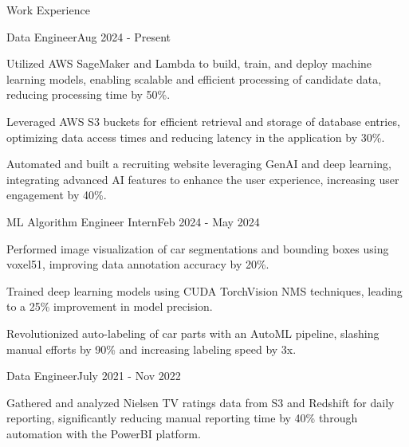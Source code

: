 \documentclass{resume} %
\begin{document}
    \begin{rSection}{Work Experience}
                    \begin{rSubsection}
                {Data Engineer}{Aug 2024 - Present}
                                    {}
                                {}
                                    \item Utilized AWS SageMaker and Lambda to build, train, and deploy machine learning models, enabling scalable and efficient processing of candidate data, reducing processing time by 50\%.
                                    \item Leveraged AWS S3 buckets for efficient retrieval and storage of database entries, optimizing data access times and reducing latency in the application by 30\%.
                                    \item Automated and built a recruiting website leveraging GenAI and deep learning, integrating advanced AI features to enhance the user experience, increasing user engagement by 40\%.
                            \end{rSubsection}
                    \begin{rSubsection}
                {ML Algorithm Engineer Intern}{Feb 2024 - May 2024}
                                    {}
                                {}
                                    \item Performed image visualization of car segmentations and bounding boxes using voxel51, improving data annotation accuracy by 20\%.
                                    \item Trained deep learning models using CUDA TorchVision NMS techniques, leading to a 25\% improvement in model precision.
                                    \item Revolutionized auto{-}labeling of car parts with an AutoML pipeline, slashing manual efforts by 90\% and increasing labeling speed by 3x.
                            \end{rSubsection}
                    \begin{rSubsection}
                {Data Engineer}{July 2021 - Nov 2022}
                                    {}
                                {}
                                    \item Gathered and analyzed Nielsen TV ratings data from S3 and Redshift for daily reporting, significantly reducing manual reporting time by 40\% through automation with the PowerBI platform.

\end{rSubsection}
\end{rSection}
\end{document}
